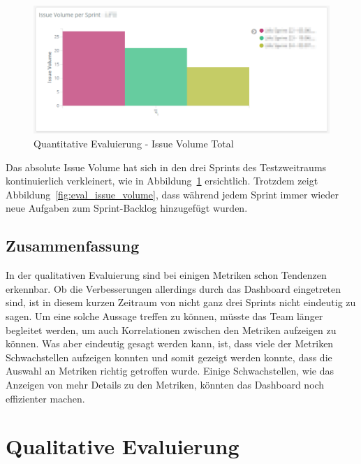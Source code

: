 \begin{savenotes}
    \begin{figure}[H]
      \centering
      \includegraphics[width=1.0\textwidth]{img/eval-volume-total.png}
      \caption{Quantitative Evaluierung {-} Issue Volume Total}\label{fig:eval_issue_volume_total}
    \end{figure}
\end{savenotes}

Das absolute Issue Volume hat sich in den drei Sprints des Testzweitraums kontinuierlich verkleinert, wie in Abbildung~\ref{fig:eval_issue_volume_total} ersichtlich.
Trotzdem zeigt Abbildung~\ref{fig:eval_issue_volume}, dass während jedem Sprint immer wieder neue Aufgaben zum Sprint-Backlog hinzugefügt wurden.

\clearpage
\subsection*{Zusammenfassung}

In der qualitativen Evaluierung sind bei einigen Metriken schon Tendenzen erkennbar.
Ob die Verbesserungen allerdings durch das Dashboard eingetreten sind, ist in diesem kurzen Zeitraum von nicht ganz drei Sprints nicht eindeutig zu sagen.
Um eine solche Aussage treffen zu können, müsste das Team länger begleitet werden, um auch Korrelationen zwischen den Metriken aufzeigen zu können.
Was aber eindeutig gesagt werden kann, ist, dass viele der Metriken Schwachstellen aufzeigen konnten und somit gezeigt werden konnte, dass die Auswahl an Metriken richtig getroffen wurde.
Einige Schwachstellen, wie das Anzeigen von mehr Details zu den Metriken, könnten das Dashboard noch effizienter machen.

\clearpage
\section{Qualitative Evaluierung}

